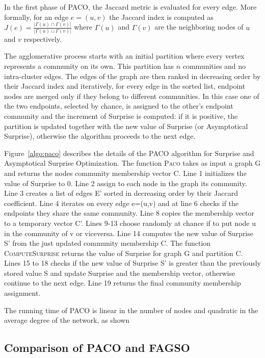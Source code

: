 In the first phase of PACO, the Jaccard metric is evaluated for every edge. More formally, for an edge $e=(u,v)$ the Jaccard index is computed as $J(e)=\frac{|\Gamma(u) \cap \Gamma(v)|}{|\Gamma(u) \cup \Gamma(v)|}$ where $\Gamma(u)$ and $\Gamma(v)$ are the neighboring nodes of $u$ and $v$ respectively.

The agglomerative process starts with an initial partition where every vertex represents a community on its own. This partition has $n$ communities and no intra-cluster edges.
The edges of the graph are then ranked in decreasing order by their Jaccard index and iteratively, for every edge in the sorted list, endpoint nodes are merged only if they belong to different communities. In this case one of the two endpoints, selected by chance, is assigned to the other's endpoint community and the increment of Surprise is computed: if it is positive, the partition is updated together with the new value of Surprise (or Asymptotical Surprise), otherwise the algorithm proceeds to the next edge.  

Figure~\ref{algo:paco} describes the details of the PACO algorithm for Surprise and Asymptotical Surprise Optimization.
The function \textsc{Paco} takes as input a graph G and returns the nodes community membership vector C. Line 1 initializes the value of Surprise to 0. Line 2 assign to each node in the graph its community. Line 3 creates a list of edges E' sorted in decreasing order by their Jaccard coefficient. Line 4 iterates on every edge e=(u,v) and at line 6 checks if the endpoints they share the same community. Line 8 copies the membership vector to a temporary vector C'. Lines 9-13 choose randomly at chance if to put node u in the community of v or viceversa. Line 14 computes the new value of Surprise S' from the just updated community membership C. The function \textsc{ComputeSurprise} returns the value of Surprise for graph G and partition C. Lines 15 to 18 checks if the new value of Surprise S' is greater than the previously stored value S and update Surprise and the membership vector, otherwise continue to the next edge. Line 19 returns the final community membership assignment.



The running time of PACO is linear in the number of nodes and quadratic in the average degree of the network, as shown 


\subsection{Comparison of PACO and FAGSO}


